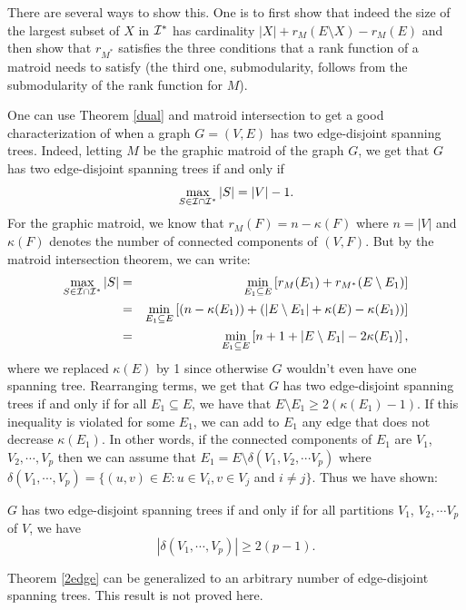 \documentclass[12pt]{article}
\begin{document}
There are several ways to show this. One is to first show that indeed
the size of the largest subset of $X$ in ${\cal I}^*$  has
cardinality $|X|+r_M(E\setminus X)-r_M(E)$ and then show that
$r_{M^*}$ satisfies the three  conditions that a rank function of a
matroid needs to satisfy (the third one, submodularity, follows
from the submodularity of the rank function for $M$). 

One can use Theorem \ref{dual} and matroid intersection to get a good
characterization of when a graph $G=(V,E)$ has two edge-disjoint spanning
trees. Indeed, letting $M$ be the graphic matroid of the graph $G$, we
get that $G$ has two edge-disjoint spanning trees if and only if 
$$\max_{S\in {\cal I} \cap {\cal I}^*} |S| = |V|-1.$$ For the
graphic matroid, we know that $r_M(F)=n -\kappa(F)$ where $n=|V|$ and
$\kappa(F)$ denotes the number of connected components of $(V,F)$.
But by the matroid intersection theorem, we can write:
\begin{eqnarray*}
\max_{S\in {\cal I}\cap {\cal I}^*} |S| & = &
\min_{E_1\subseteq E}\left[ r_M(E_1) + r_{M^*}(E\setminus E_1)\right] \\
 & = & \min_{E_1\subseteq E} \left[(n- \kappa(E_1)) + \left( |E\setminus E_1| +
\kappa(E)-\kappa(E_1)\right) \right] \\
& = &  \min_{E_1\subseteq E} \left[n + 1 + |E\setminus E_1| - 2
  \kappa(E_1) \right],
\end{eqnarray*}
where we replaced $\kappa(E)$ by 1 since otherwise $G$ wouldn't even have
one spanning tree. 
Rearranging terms, we get that $G$ has two edge-disjoint spanning trees
if and only if for all $E_1\subseteq E$, we have that $E\setminus E_1
\geq 2(\kappa(E_1)-1)$. If this inequality is violated for some $E_1$,
we can add to $E_1$ any edge that does not decrease $\kappa(E_1)$. In
other words, if the connected components of $E_1$ are $V_1$, $V_2,
\cdots, V_p$ then we can assume that $E_1=E\setminus \delta(V_1, V_2,
\cdots V_p)$ where $\delta(V_1, \cdots, V_p)=\{(u,v)\in E: u\in V_i,
v\in V_j $ and $i\neq j\}$. Thus we have shown:

\begin{theorem} \label{2edge}
$G$ has two edge-disjoint spanning trees if and only if for all
  partitions $V_1$, $V_2, \cdots V_p$ of $V$, we have 
$$ |\delta(V_1, \cdots, V_p)|\geq 2(p-1).$$
\end{theorem}

Theorem \ref{2edge} can be generalized to an arbitrary number of
edge-disjoint spanning trees. This result is not proved here. 
\end{document}
